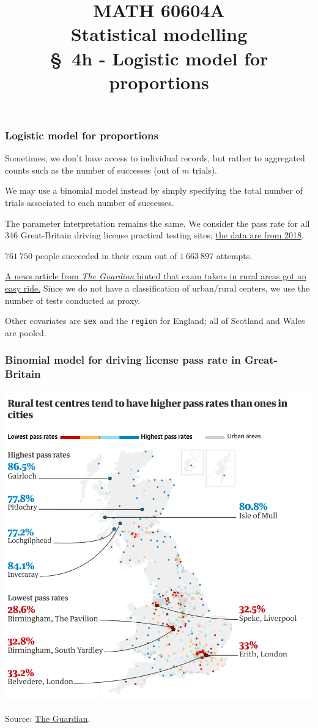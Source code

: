 \documentclass{beamer}
\title[\color{white}{MATH 60604A \S~4h - Logistic model for proportions}]{\texorpdfstring{MATH 60604A \\Statistical modelling \\ \S~4h - Logistic model for proportions}{MATH 60604A \\Statistical modelling \\ \S~4h - Logistic model for proportions}}
\author{}
\institute{HEC Montréal\\
Department of Decision Sciences}
\date{}
\begin{document}
\frame{\titlepage}

\begin{frame}
 \frametitle{Logistic model for proportions}
 
 \bi \item Sometimes, we don't have access to individual records, but rather to aggregated counts such as the number of successes (out of $m$ trials).
 \item We may use a binomial model instead by simply specifying the total number of trials associated to each number of successes.
 \item The parameter interpretation remains the same.
 \ei 
 We consider the pass rate for all 346 Great-Britain driving license practical testing sites; \href{https://www.gov.uk/government/statistical-data-sets/driving-test-statistics-drt}{the data are from 2018}.

\bi 
\item $761\ 750$ people succeeded in their exam out of $1\ 663\ 897$ attempts.
\item \href{https://www.theguardian.com/world/2019/aug/23/an-easy-ride-scottish-village-fuels-debate-driving-test-pass-rates}{A news article from \textit{The Guardian} hinted that exam takers in rural areas got an easy ride.} Since we do not have a classification of urban/rural centers, we use the number of tests conducted as proxy.
\item Other covariates are \texttt{sex} and the \texttt{region} for England; all of Scotland and Wales are pooled.
\ei
 \end{frame}
 \begin{frame}
 \frametitle{Binomial model for driving license pass rate in Great-Britain}
 \begin{center}
  \includegraphics[width = 0.6\linewidth]{img/c4/01-intro-Guardian_UK_driving2.png}
 \end{center}
 {\footnotesize 
Source: \href{https://www.theguardian.com/world/2019/aug/23/an-easy-ride-scottish-village-fuels-debate-driving-test-pass-rates}{The Guardian}.}
\end{frame}
\end{document}

